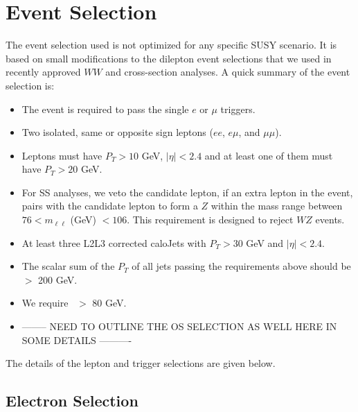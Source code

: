 \section{Event Selection}
\label{sec:eventselection}

The event selection used is not optimized for any specific SUSY scenario.
It is based on small modifications to the dilepton event selections 
that we used in recently approved 
$WW$\cite{ww} and \ttbar\cite{ttbar} cross-section
analyses.  A quick summary of the event selection is:
\begin{itemize}
\item The event is required to pass the single $e$ or $\mu$  triggers.
\item Two isolated, same or opposite sign leptons ($ee$, $e\mu$, and $\mu\mu$). 
\item Leptons must have $P_T > 10$ GeV, $|\eta|< 2.4$ and at least one of them must have $P_T > 20$ GeV.
\item For SS analyses, we veto the candidate lepton, if an extra lepton in the event, pairs with the candidate lepton
to form a $Z$ within the mass range between $76 < m_{\ell\ell} $ (GeV) $< 106$. This requirement is 
designed to reject $WZ$ events.
\item At least three L2L3 corrected caloJets with $P_T > 30$ GeV and $|\eta|< 2.4$.
\item The scalar sum of the $P_T$ of all jets passing the requirements above should be $>$ 200 GeV.
\item We require \met~$>$ 80 GeV. 
\item -------- NEED TO OUTLINE THE OS SELECTION AS WELL HERE IN SOME DETAILS ----------
\end{itemize}
\noindent The details of the lepton and trigger selections are given below.

\subsection{Electron Selection}
\label{sec:electron}

